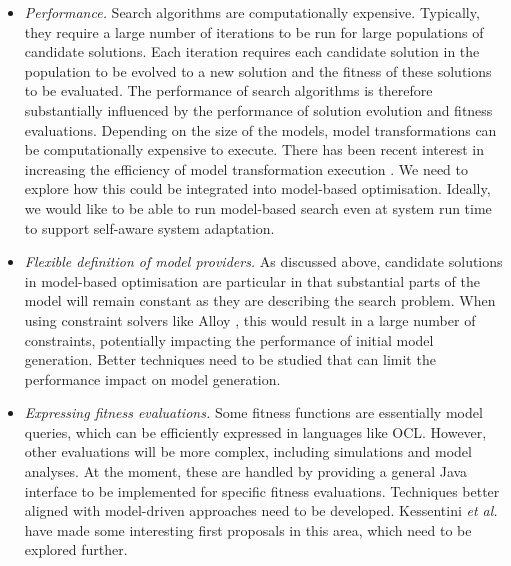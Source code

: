 \begin{itemize}
		\item \emph{Performance.} Search algorithms are computationally expensive. Typically, they require a large number of iterations to be run for large populations
		      of candidate solutions. Each iteration requires each candidate solution in the population to be evolved to a new solution and the fitness of these
					solutions to be evaluated. The performance of search algorithms is therefore substantially influenced by the performance of solution evolution and
					fitness evaluations. Depending on the size of the models, model transformations can be computationally expensive to execute. There has been recent
					interest in increasing the efficiency of model transformation execution \cite{efficient-trafos}. We need to explore how this could be integrated into
					model-based optimisation. Ideally, we would like to be able to run model-based search even at system run time to support self-aware system adaptation.

		\item \emph{Flexible definition of model providers.} As discussed above, candidate solutions in model-based optimisation are particular in that substantial
		      parts of the model will remain constant as they are describing the search problem. When using constraint solvers like Alloy \cite{alloy-based-work}, this
					would result in a large number of constraints, potentially impacting the performance of initial model generation. Better techniques need to be studied
					that can limit the performance impact on model generation.

		\item \emph{Expressing fitness evaluations.} Some fitness functions are essentially model queries, which can be efficiently expressed in languages like OCL.
		      However, other evaluations will be more complex, including simulations and model analyses. At the moment, these are handled by providing a general Java
					interface to be implemented for specific fitness evaluations. Techniques better aligned with model-driven approaches need to be developed. Kessentini 
					\emph{et al.} \cite{Kessentini+13} have made some interesting first proposals in this area, which need to be explored further.
	\end{itemize}